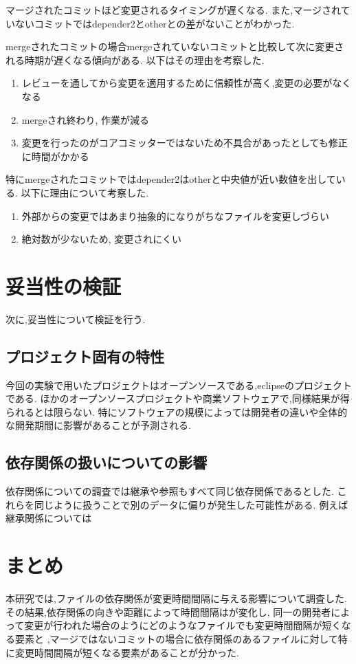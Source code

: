 \documentclass[submit,ses,noauthor]{ipsj} %
\begin{document}
マージされたコミットほど変更されるタイミングが遅くなる.
また,マージされていないコミットではdepender2とotherとの差がないことがわかった.


mergeされたコミットの場合mergeされていないコミットと比較して次に変更される時期が遅くなる傾向がある.
以下はその理由を考察した.
\begin{enumerate}
\item レビューを通してから変更を適用するために信頼性が高く,変更の必要がなくなる
\item mergeされ終わり, 作業が減る
\item 変更を行ったのがコアコミッターではないため不具合があったとしても修正に時間がかかる
\end{enumerate}

特にmergeされたコミットではdepender2はotherと中央値が近い数値を出している.
以下に理由について考察した.

\begin{enumerate}
\item 外部からの変更ではあまり抽象的になりがちなファイルを変更しづらい
\item 絶対数が少ないため, 変更されにくい
\end{enumerate}

\section{妥当性の検証}\label{妥当性の検証}
次に,妥当性について検証を行う.

\subsection{プロジェクト固有の特性}
今回の実験で用いたプロジェクトはオープンソースである,eclipseのプロジェクトである.
ほかのオープンソースプロジェクトや商業ソフトウェアで,同様結果が得られるとは限らない.
特にソフトウェアの規模によっては開発者の違いや全体的な開発期間に影響があることが予測される.

\subsection{依存関係の扱いについての影響}
依存関係についての調査では継承や参照もすべて同じ依存関係であるとした.
これらを同じように扱うことで別のデータに偏りが発生した可能性がある.
例えば継承関係については

\section{まとめ} \label{まとめ}
本研究では,ファイルの依存関係が変更時間間隔に与える影響について調査した.
その結果,依存関係の向きや距離によって時間間隔はが変化し,
同一の開発者によって変更が行われた場合のようにどのようなファイルでも変更時間間隔が短くなる要素と
,マージではないコミットの場合に依存関係のあるファイルに対して特に変更時間間隔が短くなる要素があることが分かった.
\end{document}
